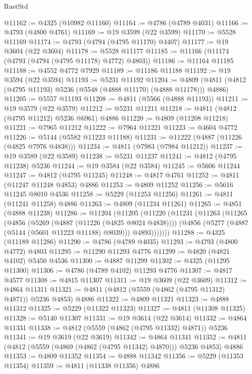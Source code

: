 \begin{lexlean}{RustStd}
\begin{coremodule}
@11162 := @4325 (@10982 @11160)
@11164 := @4786 (@4789 @4031)
@11166 := @4793 (@4800 @4761)
@11169 := @19 @3599 (@22 @3599)
@11170 := @5528 @11169
@11174 := @4793 (@4794 (@4795 @11170) @4407)
@11177 := @19 @3604 (@22 @3604)
@11178 := @5528 @11177
@11185 := @11166 (@11174 (@4793 (@4794 (@4795 @11178) @4772) @4803))
@11186 := @11164 @11185
@11188 := @4552 @4772 @7929
@11189 := @11186 @11188
@11192 := @19 @3594 (@22 @3594)
@11193 := @5231 @11192
@11204 := @4809 (@4811 (@4812 (@4795 @11193) @5236 (@5548 (@4888 @11170) (@4888 @11178))) @4886)
@11205 := @5557 @11193
@11208 := @4811 (@5566 (@4888 @11193))
@11211 := @19 @3579 (@22 @3579)
@11212 := @5231 @11211
@11218 := @4811 (@4812 (@4795 @11212) @5236 @6961) @4886
@11220 := @4809 (@11208 @11218)
@11221 := @7965 @11212
@11222 := @7964 @11221
@11223 := @4604 @4772
@11226 := @5144 (@5582 @11223 @11188)
@11231 := @11222 (@4887 (@11226 (@4825 @7976 @4838)))
@11234 := @4811 (@7983 (@7984 @11212))
@11237 := @19 @3589 (@22 @3589)
@11238 := @5231 @11237
@11241 := @4812 (@4795 @11238) @5236
@11244 := @19 @3584 (@22 @3584)
@11245 := @5606 @11244
@11247 := @4812 (@4795 @11245)
@11248 := @4817 @4761
@11252 := @4811 (@11247 @11248 @4853) @4886
@11253 := @4809 @11252
@11256 := @5616 @11245 @8010 @4536
@11258 := @5229 (@11253 @11256)
@11261 := @4811 (@11241 @11258) @4886
@11263 := @4809 (@11234 @11261)
@11265 := @4851 (@4888 @11238)
@11286 := @11204
    (@11205
      (@11220
        (@11231
          (@11263
            (@11265
              (@4856
                (@5269 (@4887 (@11226 (@4825 @8024 @4838))))
                (@4856 (@5277 (@4887 (@5144 (@5601 @11223 @11188) @8039))) @4893)))))))
@11288 := @4325 (@11189 @11286)
@11290 := @4786 (@4789 @4035)
@11293 := @4793 (@4800 @4772) @4803
@11295 := @11290 @11293 @4776
@11299 := @4820 (@4821 @4102) @5450 @4536
@11300 := @4887 @11299
@11302 := @4325 (@11295 @11300)
@11306 := @4786 (@4789 @4102) @11293 @4776
@11307 := @4817 @4577
@11308 := @4815 @11307
@11311 := @19 @3609 (@22 @3609)
@11312 := @4864 @11311
@11321 := @4811 (@4812 (@5559 (@4862 (@4795 @11312) @4871)) @5236 @4853) @4886
@11322 := @4809 @11321
@11323 := @4888 @11312
@11325 := @5229 (@11322 @11323)
@11327 := @4811 (@11308 @11325)
@11328 := @5140 @11307
@11331 := @19 @3614 (@22 @3614)
@11332 := @4864 @11331
@11338 := @4812 (@5559 (@4862 (@4795 @11332) @4871)) @5236
@11341 := @19 @3619 (@22 @3619)
@11342 := @4864 @11341
@11352 := @4811 (@4812 (@5559 (@4869 (@4862 (@4795 @11342) @4870))) @5236 @4853) @4886
@11353 := @4809 @11352
@11354 := @4888 @11342
@11356 := @5229 (@11353 @11354)
@11359 := @4811 (@11338 @11356) @4886

\end{coremodule}
\end{lexlean}
